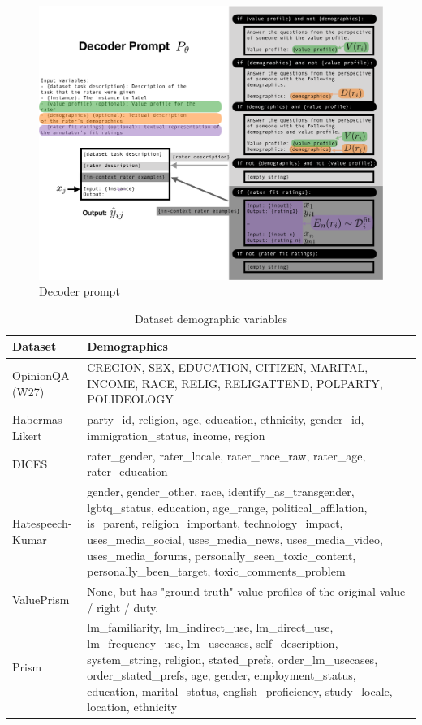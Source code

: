 \documentclass[11pt]{article}
\begin{document}
\begin{figure}[t]
\centering
\includegraphics[width=\textwidth]{files/decoder_prompt_cropped.pdf}
\caption{Decoder prompt}
\label{fig:decoderprompt}
\end{figure}

\begin{table}[h]
\centering
\small
\begin{tabular}{|p{3cm}|p{12cm}|}
\hline
Dataset & Demographics \\
\hline
OpinionQA (W27) & CREGION, SEX, EDUCATION, CITIZEN, MARITAL, INCOME, RACE, RELIG, RELIGATTEND, POLPARTY, POLIDEOLOGY \\
\hline
Habermas-Likert & party\_id, religion, age, education, ethnicity, gender\_id, immigration\_status, income, region \\
\hline
DICES & rater\_gender, rater\_locale, rater\_race\_raw, rater\_age, rater\_education \\
\hline
Hatespeech-Kumar & gender, gender\_other, race, identify\_as\_transgender, lgbtq\_status, education, age\_range, political\_affilation, is\_parent, religion\_important, technology\_impact, uses\_media\_social, uses\_media\_news, uses\_media\_video, uses\_media\_forums, personally\_seen\_toxic\_content, personally\_been\_target, toxic\_comments\_problem \\
\hline
ValuePrism & None, but has "ground truth" value profiles of the original value / right / duty. \\
\hline
Prism & lm\_familiarity, lm\_indirect\_use, lm\_direct\_use, lm\_frequency\_use, lm\_usecases, self\_description, system\_string, religion, stated\_prefs, order\_lm\_usecases, order\_stated\_prefs, age, gender, employment\_status, education, marital\_status, english\_proficiency, study\_locale, location, ethnicity \\
\hline
\end{tabular}
\caption{Dataset demographic variables}
\label{tab:demographics}
\end{table}
\end{document}
